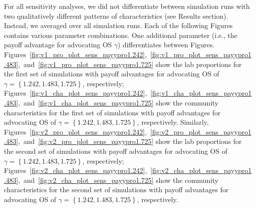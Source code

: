 \documentclass[meta, authordate]{jote-new-article}
\begin{document}
For all sensitivity analyses, we did not differentiate between simulation runs with two qualitatively different patterns of characteristics (see Results section). Instead, we averaged over all simulation runs. Each of the following Figures contains various parameter combinations. One additional parameter (i.e., the payoff advantage for advocating OS $\gamma$) differentiates between Figures. Figures~\ref{fig:v1_pro_plot_sens_payypro1.242},~\ref{fig:v1_pro_plot_sens_payypro1.483},~and~\ref{fig:v1_pro_plot_sens_payypro1.725} show the lab proportions for the first set of simulations with payoff advantages for advocating OS of $\gamma=\left\{1.242, 1.483, 1.725\right\}$, respectively; Figures~\ref{fig:v1_cha_plot_sens_payypro1.242},~\ref{fig:v1_cha_plot_sens_payypro1.483},~and~\ref{fig:v1_cha_plot_sens_payypro1.725} show the community characteristics for the first set of simulations with payoff advantages for advocating OS of $\gamma=\left\{1.242, 1.483, 1.725\right\}$, respectively. Similarly, Figures~\ref{fig:v2_pro_plot_sens_payypro1.242},~\ref{fig:v2_pro_plot_sens_payypro1.483},~and~\ref{fig:v2_pro_plot_sens_payypro1.725} show the lab proportions for the second set of simulations with payoff advantages for advocating OS of $\gamma=\left\{1.242, 1.483, 1.725\right\}$, respectively; Figures~\ref{fig:v2_cha_plot_sens_payypro1.242},~\ref{fig:v2_cha_plot_sens_payypro1.483},~and~\ref{fig:v2_cha_plot_sens_payypro1.725} show the community characteristics for the second set of simulations with payoff advantages for advocating OS of $\gamma=\left\{1.242, 1.483, 1.725\right\}$, respectively.
\end{document}
